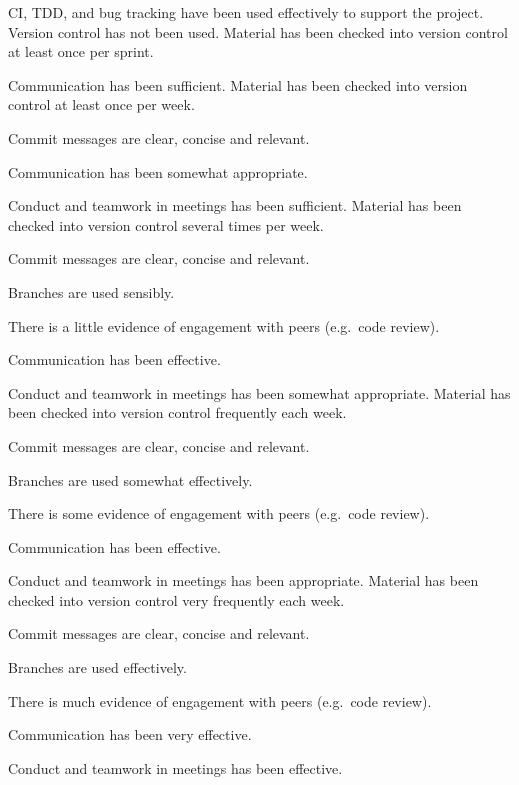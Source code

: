\documentclass{../../fal_assignment}
\begin{document}
\begin{markingrubric}
            \par CI, TDD, and bug tracking have been used effectively to support the project.
%
        \grade\fail Version control has not been used.
        \grade Material has been checked into version control at least once per sprint.
            \par Communication has been sufficient.
        \grade Material has been checked into version control at least once per week.
            \par Commit messages are clear, concise and relevant.
            \par Communication has been somewhat appropriate.
            \par Conduct and teamwork in meetings has been sufficient.
        \grade Material has been checked into version control several times per week.
            \par Commit messages are clear, concise and relevant.
            \par Branches are used sensibly.
            \par There is a little evidence of engagement with peers (e.g.\ code review).
            \par Communication has been effective.
            \par Conduct and teamwork in meetings has been somewhat appropriate.
        \grade Material has been checked into version control frequently each week.
            \par Commit messages are clear, concise and relevant.
            \par Branches are used somewhat effectively.
            \par There is some evidence of engagement with peers (e.g.\ code review).
            \par Communication has been effective.
            \par Conduct and teamwork in meetings has been appropriate.
        \grade Material has been checked into version control very frequently each week.
            \par Commit messages are clear, concise and relevant.
            \par Branches are used effectively.
            \par There is much evidence of engagement with peers (e.g.\ code review).
            \par Communication has been very effective.
            \par Conduct and teamwork in meetings has been effective.

\end{markingrubric}
\end{document}
